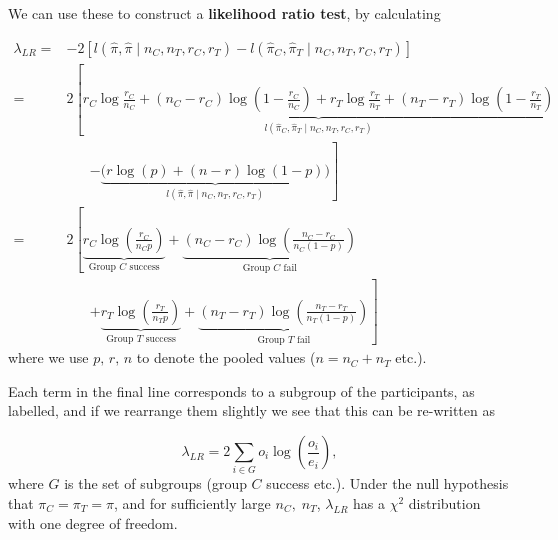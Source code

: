\documentclass[
  openany]{book}
\theoremstyle{definition}
\theoremstyle{definition}
\theoremstyle{definition}
\theoremstyle{definition}
\theoremstyle{remark}
\begin{document}
We can use these to construct a \textbf{likelihood ratio test}, by calculating

\[
\begin{aligned}
\lambda_{LR} = & -2\left[l\left( \hat\pi,\hat\pi \mid {n_C,n_T, r_C, r_T}\right) - l\left( \hat\pi_C,\hat\pi_T \mid {n_C,n_T, r_C, r_T}\right)\right]\\
 =  & 2\left[\underbrace{r_C\log\frac{r_C}{n_C} + \left(n_C-r_C\right)\log\left(1-\frac{r_C}{n_C}\right) + r_T\log\frac{r_T}{n_T} + \left(n_T-r_T\right)\log\left(1-\frac{r_T}{n_T}\right) }_{l\left( \hat\pi_C,\hat\pi_T \mid {n_C,n_T, r_C, r_T}\right)} \right. \\
&\;\;\;\;\;\; \left. - \underbrace{\Big(r\log\left(p\right) + \left(n-r\right)\log\left(1-p\right)\Big)}_{l\left( \hat\pi,\hat\pi \mid {n_C,n_T, r_C, r_T}\right)}\right]\\
 =& 2\left[\underbrace{r_C \log\left(\frac{r_C}{n_C p}\right)}_{\text{Group }C\text{ success}} + \underbrace{\left(n_C - r_C\right)\log\left(\frac{n_C - r_C}{n_C\left(1-p\right)}\right)}_{\text{Group }C\text{ fail}} \right.\\
 & \;\;\;\;\;\; \left.+ \underbrace{r_T \log\left(\frac{r_T}{n_T p}\right)}_{\text{Group }T\text{ success}} + \underbrace{\left(n_T - r_T\right)\log\left(\frac{n_T - r_T}{n_T\left(1-p\right)}\right)}_{\text{Group }T\text{ fail}}\right]
\end{aligned}
\]
where we use \(p,\, r,\, n\) to denote the pooled values (\(n = n_C + n_T\) etc.).

Each term in the final line corresponds to a subgroup of the participants, as labelled, and if we rearrange them slightly we see that this can be re-written as

\[\lambda_{LR} = 2 \sum\limits_{i\in G} o_i \log\left(\frac{o_i}{e_i}\right),\]
where \(G\) is the set of subgroups (group \(C\) success etc.). Under the null hypothesis that \(\pi_C = \pi_T = \pi\), and for sufficiently large \(n_C,\;n_T\), \(\lambda_{LR}\) has a \(\chi^2\) distribution with one degree of freedom.
\end{document}
